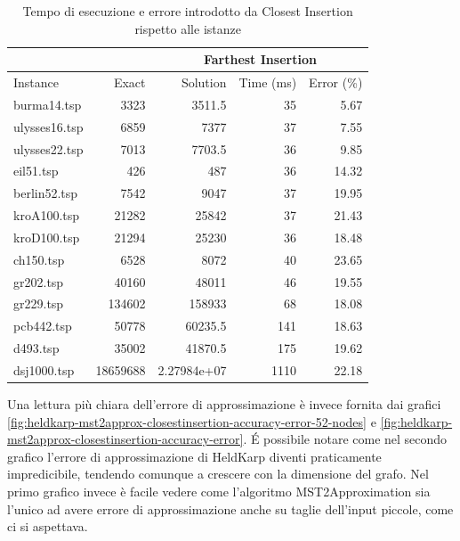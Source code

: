 \begin{table}[h]
    \centering

    \begin{tabular}{lrrrr}
    \toprule
    \multicolumn{2}{c}{ } & \multicolumn{3}{c}{Farthest Insertion} \\
    \hline
    Instance & Exact & Solution &   Time (ms) &   Error (\%) \\
    \hline
    burma14.tsp   &     3323 &   3511.5         &          35 &        5.67 \\
    ulysses16.tsp &     6859 &   7377           &          37 &        7.55 \\
    ulysses22.tsp &     7013 &   7703.5         &          36 &        9.85 \\
    eil51.tsp     &      426 &    487           &          36 &       14.32 \\
    berlin52.tsp  &     7542 &   9047           &          37 &       19.95 \\
    kroA100.tsp   &    21282 &  25842           &          37 &       21.43 \\
    kroD100.tsp   &    21294 &  25230           &          36 &       18.48 \\
    ch150.tsp     &     6528 &   8072           &          40 &       23.65 \\
    gr202.tsp     &    40160 &  48011           &          46 &       19.55 \\
    gr229.tsp     &   134602 & 158933           &          68 &       18.08 \\
    pcb442.tsp    &    50778 &  60235.5         &         141 &       18.63 \\
    d493.tsp      &    35002 &  41870.5         &         175 &       19.62 \\
    dsj1000.tsp   & 18659688 &      2.27984e+07 &        1110 &       22.18 \\
    \bottomrule
    \end{tabular}

    \caption{Tempo di esecuzione e errore introdotto da Closest Insertion rispetto alle istanze}
    \label{table:closest-insertion-runtime-accuracy}
\end{table}

Una lettura più chiara dell'errore di approssimazione è invece
fornita dai grafici
\ref{fig:heldkarp-mst2approx-closestinsertion-accuracy-error-52-nodes}
 e \ref{fig:heldkarp-mst2approx-closestinsertion-accuracy-error}.
\'E possibile notare come nel
secondo grafico l'errore di approssimazione di HeldKarp diventi
praticamente impredicibile, tendendo comunque a crescere con la
dimensione del grafo. Nel primo grafico invece è facile vedere
come l'algoritmo MST2Approximation sia l'unico ad avere errore
di approssimazione anche su taglie dell'input piccole,
come ci si aspettava.

